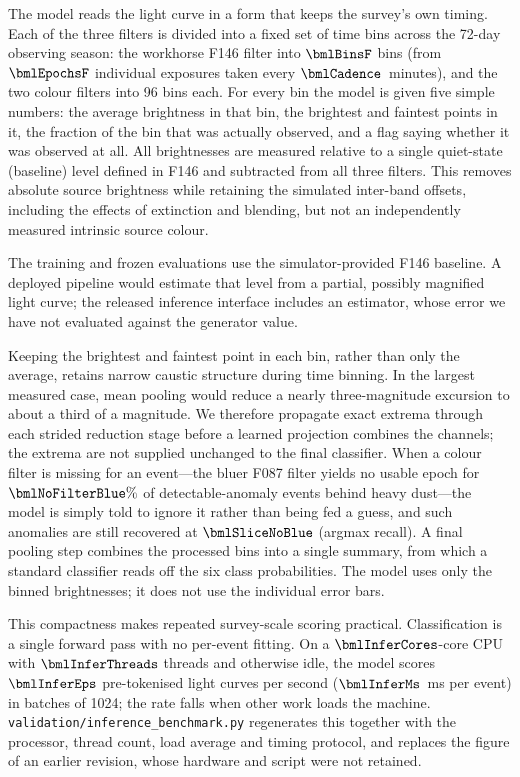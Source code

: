 \documentclass[twocolumn,linenumbers,floatfix,twocolappendix]{aastex701}
\newcommand{\code}[1]{\texttt{#1}}
\begin{document}
The model reads the light curve in a form that keeps the survey's own timing. Each of the three
filters is divided into a fixed set of time bins across the 72-day observing season: the workhorse
F146 filter into $\bmlBinsF$ bins (from $\bmlEpochsF$ individual exposures taken every
$\bmlCadence$~minutes), and the two colour filters into 96 bins each. For every bin the model is
given five simple numbers: the average brightness in that bin, the brightest and faintest points
in it, the fraction of the bin that was actually observed, and a flag saying whether it was
observed at all. All brightnesses are measured relative to a single quiet-state (baseline)
level defined in F146 and subtracted from all three filters. This removes absolute source
brightness while retaining the simulated inter-band offsets, including the effects of extinction
and blending, but not an independently measured intrinsic source colour.

The training and frozen evaluations use the simulator-provided F146 baseline. A deployed pipeline
would estimate that level from a partial, possibly magnified light curve; the released inference
interface includes an estimator, whose error we have not evaluated against the generator value.

Keeping the brightest and faintest point in each bin, rather than only the average, retains narrow
caustic structure during time binning. In the largest measured case, mean pooling
would reduce a nearly three-magnitude excursion to about a third of a magnitude. We therefore
propagate exact extrema through each strided reduction stage before a learned projection combines
the channels; the extrema are not supplied unchanged to the final classifier. When a colour filter
is missing for an event---the
bluer F087 filter yields no usable epoch for $\bmlNoFilterBlue\%$ of detectable-anomaly
events behind heavy dust---the model is simply told to
ignore it rather than being fed a guess, and such anomalies are still recovered at $\bmlSliceNoBlue$ (argmax recall). A final pooling step combines the processed bins into a
single summary, from which a standard classifier reads off the six class probabilities. The model
uses only the binned brightnesses; it does not use the individual error bars.

This compactness makes repeated survey-scale scoring practical. Classification is a single forward
pass with no per-event fitting. On a $\bmlInferCores$-core \bmlInferCpu{} CPU with
$\bmlInferThreads$ threads and otherwise idle, the model scores $\bmlInferEps$ pre-tokenised light curves per second
($\bmlInferMs$~ms per event) in batches of 1024; the rate falls when other work loads the machine.
\code{validation/inference\_benchmark.py} regenerates this together with the processor, thread count, load average
and timing protocol, and replaces the figure of an earlier revision, whose hardware and script were not retained.
\end{document}
